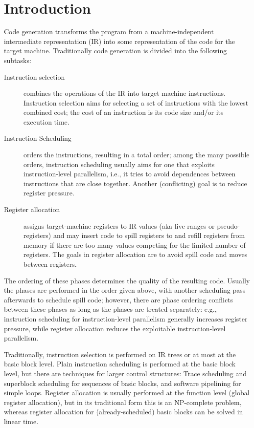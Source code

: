 \chapter{Introduction }

Code generation transforms the program from a machine-independent
intermediate representation (IR) into some representation of the code for
the target machine.  Traditionally code generation is divided into the
following subtasks:

\begin{description}

\item[Instruction selection] combines the operations of the IR into
  target machine instructions.  Instruction selection aims for
  selecting a set of instructions with the lowest combined cost; the
  cost of an instruction is its code size and/or its execution time.

\item[Instruction Scheduling] orders the instructions, resulting in a
  total order; among the many possible orders, instruction scheduling
  usually aims for one that exploits instruction-level parallelism,
  i.e., it tries to avoid dependences between instructions that are
  close together.  Another (conflicting) goal is to reduce register
  pressure.

\item[Register allocation] assigns target-machine registers to IR
  values (aka live ranges or pseudo-registers) and may insert code to
  spill registers to and refill registers from memory if there are too
  many values competing for the limited number of registers.  The
  goals in register allocation are to avoid spill code and
  moves between registers.

\end{description}

The ordering of these phases determines the quality of the resulting
code.  Usually the phases are performed in the order given above, with
another scheduling pass afterwards to schedule spill code; however,
there are phase ordering conflicts between these phases as long as the
phases are treated separately: e.g., instruction scheduling for
instruction-level parallelism generally increases register pressure,
while register allocation reduces the exploitable instruction-level
parallelism.

Traditionally, instruction selection is performed on IR trees or at
most at the basic block level. Plain instruction scheduling is
performed at the basic block level, but there are techniques for
larger control structures: Trace scheduling and superblock scheduling
for sequences of basic blocks, and software pipelining for simple
loops.  Register allocation is usually performed at the function level
(global register allocation), but in its traditional form this is an
NP-complete problem, whereas register allocation for
(already-scheduled) basic blocks can be solved in linear time.

